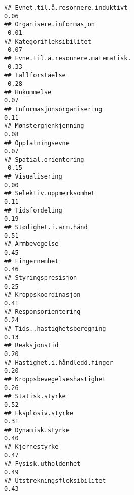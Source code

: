 \documentclass[
]{article}
\begin{document}
\begin{verbatim}
## Evnet.til.å.resonnere.induktivt                                                   0.06
## Organisere.informasjon                                                           -0.01
## Kategorifleksibilitet                                                            -0.07
## Evne.til.å.resonnere.matematisk.                                                 -0.33
## Tallforståelse                                                                   -0.28
## Hukommelse                                                                        0.07
## Informasjonsorganisering                                                          0.11
## Mønstergjenkjenning                                                               0.08
## Oppfatningsevne                                                                   0.07
## Spatial.orientering                                                              -0.15
## Visualisering                                                                     0.00
## Selektiv.oppmerksomhet                                                            0.11
## Tidsfordeling                                                                     0.19
## Stødighet.i.arm.hånd                                                              0.51
## Armbevegelse                                                                      0.45
## Fingernemhet                                                                      0.46
## Styringspresisjon                                                                 0.25
## Kroppskoordinasjon                                                                0.41
## Responsorientering                                                                0.24
## Tids..hastighetsberegning                                                         0.13
## Reaksjonstid                                                                      0.20
## Hastighet.i.håndledd.finger                                                       0.20
## Kroppsbevegelseshastighet                                                         0.26
## Statisk.styrke                                                                    0.52
## Eksplosiv.styrke                                                                  0.31
## Dynamisk.styrke                                                                   0.40
## Kjernestyrke                                                                      0.47
## Fysisk.utholdenhet                                                                0.49
## Utstrekningsfleksibilitet                                                         0.43

\end{verbatim}
\end{document}
